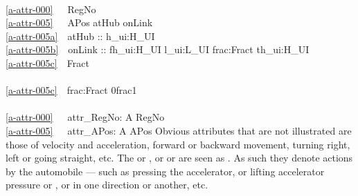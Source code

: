 {%
\bp
{}\\
\ref{a-attr-000}\ \ \ RegNo\\
\ref{a-attr-005}\ \ \ APos {\EQ}{\EQ} atHub {\BAR} onLink\\
\ref{a-attr-005a}\ \ atHub :: h\_ui:H\_UI \\
\ref{a-attr-005b}\ \ onLink :: fh\_ui:H\_UI {\TIMES} l\_ui:L\_UI {\TIMES} frac:Fract {\TIMES} th\_ui:H\_UI\\
\ref{a-attr-005c}\ \ Fract {\EQ} \\
\\
\ref{a-attr-005c}\ \ frac:Fract {\RDOT} 0{\LT}frac{\LT}1 \\
\ \ \\
\ref{a-attr-000}\ \ \ attr\_RegNo: A {\RIGHTARROW} RegNo \\
\ref{a-attr-005}\ \ \ attr\_APos: A {\RIGHTARROW} APos 
\ep
\mnewfoil\smallish\HHHH
\noindent
\begynd
\pind Obvious attributes that are not illustrated are those of
\begynd
\pind velocity and acceleration, 
\pind forward or backward movement, 
\pind turning right, left or going straight, 
\pind etc.
\afslut
\afslut
\mnewfoil
\noindent
\begynd
\pind The  or , or  or
       are seen as . 
\begynd
\pind As such they denote actions by the automobile ---
\pind such as \textsf{pressing the accelerator}, or \textsf{lifting
      accelerator pressure} or 
      , or  in one direction or
      another, etc.
}

